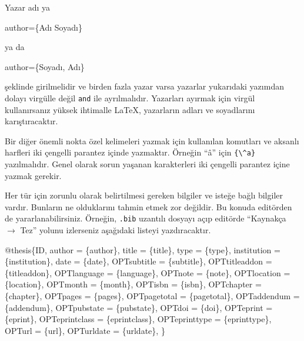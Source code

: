 \documentclass[
  letterpaper,
  DIV=11,
  numbers=noendperiod]{scrreprt}
\newenvironment{Shaded}{\begin{snugshade}}{\end{snugshade}}
\newcommand{\CommentTok}[1]{\textcolor[rgb]{0.37,0.37,0.37}{#1}}
\newcommand{\DataTypeTok}[1]{\textcolor[rgb]{0.68,0.00,0.00}{#1}}
\newcommand{\NormalTok}[1]{\textcolor[rgb]{0.00,0.23,0.31}{#1}}
\newcommand{\OtherTok}[1]{\textcolor[rgb]{0.00,0.23,0.31}{#1}}
\newcommand{\VariableTok}[1]{\textcolor[rgb]{0.07,0.07,0.07}{#1}}
\begin{document}
Yazar adı ya

\begin{Shaded}
\begin{Highlighting}[]
\CommentTok{author=\{Adı Soyadı\}}
\end{Highlighting}
\end{Shaded}

ya da

\begin{Shaded}
\begin{Highlighting}[]
\CommentTok{author=\{Soyadı, Adı\}}
\end{Highlighting}
\end{Shaded}

şeklinde girilmelidir ve birden fazla yazar varsa yazarlar yukarıdaki
yazımdan dolayı virgülle değil \texttt{and} ile ayrılmalıdır. Yazarları
ayırmak için virgül kullanırsanız yüksek ihtimalle {\LaTeX}, yazarların
adları ve soyadlarını karıştıracaktır.

Bir diğer önemli nokta özel kelimeleri yazmak için kullanılan komutları
ve aksanlı harfleri iki çengelli parantez içinde yazmaktır. Örneğin
``â'' için \texttt{\{\textbackslash{}\^{}a\}} yazılmalıdır. Genel olarak
sorun yaşanan karakterleri iki çengelli parantez içine yazmak gerekir.

Her tür için zorunlu olarak belirtilmesi gereken bilgiler ve isteğe
bağlı bilgiler vardır. Bunların ne olduklarını tahmin etmek zor
değildir. Bu konuda editörden de yararlanabilirsiniz. Örneğin,
\texttt{.bib} uzantılı dosyayı açıp editörde ``Kaynakça \(\rightarrow\)
Tez'' yolunu izlerseniz aşağıdaki listeyi yazdıracaktır.

\begin{Shaded}
\begin{Highlighting}[]
\VariableTok{@thesis}\NormalTok{\{}\OtherTok{ID}\NormalTok{,}
    \DataTypeTok{author}\NormalTok{ = \{author\},}
    \DataTypeTok{title}\NormalTok{ = \{title\},}
    \DataTypeTok{type}\NormalTok{ = \{type\},}
    \DataTypeTok{institution}\NormalTok{ = \{institution\},}
    \DataTypeTok{date}\NormalTok{ = \{date\},}
    \DataTypeTok{OPTsubtitle}\NormalTok{ = \{subtitle\},}
    \DataTypeTok{OPTtitleaddon}\NormalTok{ = \{titleaddon\},}
    \DataTypeTok{OPTlanguage}\NormalTok{ = \{language\},}
    \DataTypeTok{OPTnote}\NormalTok{ = \{note\},}
    \DataTypeTok{OPTlocation}\NormalTok{ = \{location\},}
    \DataTypeTok{OPTmonth}\NormalTok{ = \{month\},}
    \DataTypeTok{OPTisbn}\NormalTok{ = \{isbn\},}
    \DataTypeTok{OPTchapter}\NormalTok{ = \{chapter\},}
    \DataTypeTok{OPTpages}\NormalTok{ = \{pages\},}
    \DataTypeTok{OPTpagetotal}\NormalTok{ = \{pagetotal\},}
    \DataTypeTok{OPTaddendum}\NormalTok{ = \{addendum\},}
    \DataTypeTok{OPTpubstate}\NormalTok{ = \{pubstate\},}
    \DataTypeTok{OPTdoi}\NormalTok{ = \{doi\},}
    \DataTypeTok{OPTeprint}\NormalTok{ = \{eprint\},}
    \DataTypeTok{OPTeprintclass}\NormalTok{ = \{eprintclass\},}
    \DataTypeTok{OPTeprinttype}\NormalTok{ = \{eprinttype\},}
    \DataTypeTok{OPTurl}\NormalTok{ = \{url\},}
    \DataTypeTok{OPTurldate}\NormalTok{ = \{urldate\},}
\NormalTok{\}}
\end{Highlighting}
\end{Shaded}
\end{document}
